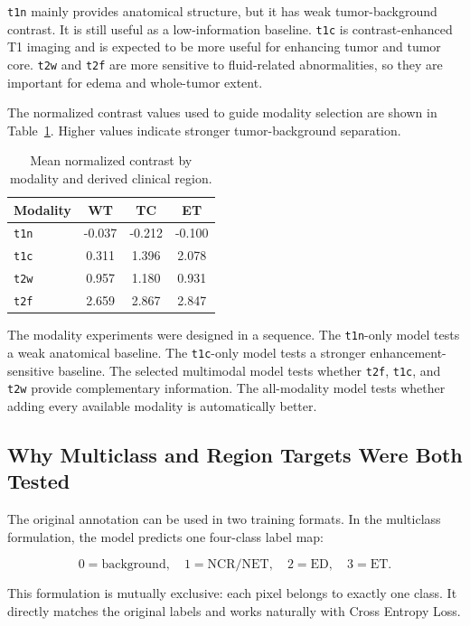 \texttt{t1n} mainly provides anatomical structure, but it has weak tumor-background contrast. It is still useful as a low-information baseline. \texttt{t1c} is contrast-enhanced T1 imaging and is expected to be more useful for enhancing tumor and tumor core. \texttt{t2w} and \texttt{t2f} are more sensitive to fluid-related abnormalities, so they are important for edema and whole-tumor extent.

The normalized contrast values used to guide modality selection are shown in Table~\ref{tab:contrast}. Higher values indicate stronger tumor-background separation.

\begin{table}[h]
\centering
\begin{tabular}{lccc}
\hline
Modality & WT & TC & ET \\
\hline
\texttt{t1n} & -0.037 & -0.212 & -0.100 \\
\texttt{t1c} & 0.311 & 1.396 & 2.078 \\
\texttt{t2w} & 0.957 & 1.180 & 0.931 \\
\texttt{t2f} & 2.659 & 2.867 & 2.847 \\
\hline
\end{tabular}
\caption{Mean normalized contrast by modality and derived clinical region.}
\label{tab:contrast}
\end{table}

The modality experiments were designed in a sequence. The \texttt{t1n}-only model tests a weak anatomical baseline. The \texttt{t1c}-only model tests a stronger enhancement-sensitive baseline. The selected multimodal model tests whether \texttt{t2f}, \texttt{t1c}, and \texttt{t2w} provide complementary information. The all-modality model tests whether adding every available modality is automatically better.

\subsection{Why Multiclass and Region Targets Were Both Tested}

The original annotation can be used in two training formats. In the multiclass formulation, the model predicts one four-class label map:

\[
0=\mathrm{background}, \quad
1=\mathrm{NCR/NET}, \quad
2=\mathrm{ED}, \quad
3=\mathrm{ET}.
\]

This formulation is mutually exclusive: each pixel belongs to exactly one class. It directly matches the original labels and works naturally with Cross Entropy Loss.

